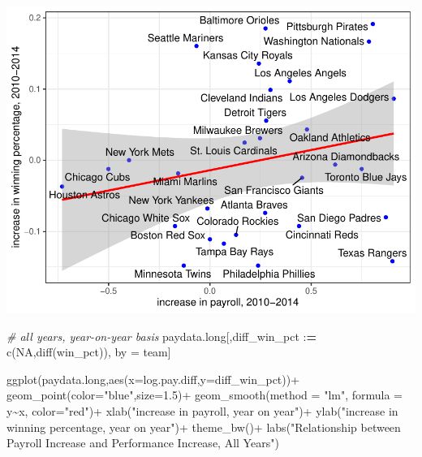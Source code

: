 \documentclass[
  12pt,
]{article}
\newenvironment{Shaded}{\begin{snugshade}}{\end{snugshade}}
\newcommand{\AttributeTok}[1]{\textcolor[rgb]{0.77,0.63,0.00}{#1}}
\newcommand{\CommentTok}[1]{\textcolor[rgb]{0.56,0.35,0.01}{\textit{#1}}}
\newcommand{\ConstantTok}[1]{\textcolor[rgb]{0.00,0.00,0.00}{#1}}
\newcommand{\ErrorTok}[1]{\textcolor[rgb]{0.64,0.00,0.00}{\textbf{#1}}}
\newcommand{\FloatTok}[1]{\textcolor[rgb]{0.00,0.00,0.81}{#1}}
\newcommand{\FunctionTok}[1]{\textcolor[rgb]{0.00,0.00,0.00}{#1}}
\newcommand{\NormalTok}[1]{#1}
\newcommand{\OtherTok}[1]{\textcolor[rgb]{0.56,0.35,0.01}{#1}}
\newcommand{\SpecialCharTok}[1]{\textcolor[rgb]{0.00,0.00,0.00}{#1}}
\newcommand{\StringTok}[1]{\textcolor[rgb]{0.31,0.60,0.02}{#1}}
\begin{document}
\includegraphics{hw1_sol_files/figure-latex/unnamed-chunk-16-1.pdf}

\begin{Shaded}
\begin{Highlighting}[]
\CommentTok{\# all years, year{-}on{-}year basis}
\NormalTok{paydata.long[,diff\_win\_pct }\SpecialCharTok{:}\ErrorTok{=} \FunctionTok{c}\NormalTok{(}\ConstantTok{NA}\NormalTok{,}\FunctionTok{diff}\NormalTok{(win\_pct)), by }\OtherTok{=}\NormalTok{ team]}

\FunctionTok{ggplot}\NormalTok{(paydata.long,}\FunctionTok{aes}\NormalTok{(}\AttributeTok{x=}\NormalTok{log.pay.diff,}\AttributeTok{y=}\NormalTok{diff\_win\_pct))}\SpecialCharTok{+}
  \FunctionTok{geom\_point}\NormalTok{(}\AttributeTok{color=}\StringTok{"blue"}\NormalTok{,}\AttributeTok{size=}\FloatTok{1.5}\NormalTok{)}\SpecialCharTok{+}
  \FunctionTok{geom\_smooth}\NormalTok{(}\AttributeTok{method =} \StringTok{"lm"}\NormalTok{, }\AttributeTok{formula =}\NormalTok{ y}\SpecialCharTok{\textasciitilde{}}\NormalTok{x, }\AttributeTok{color=}\StringTok{"red"}\NormalTok{)}\SpecialCharTok{+}
  \FunctionTok{xlab}\NormalTok{(}\StringTok{"increase in payroll, year on year"}\NormalTok{)}\SpecialCharTok{+}
  \FunctionTok{ylab}\NormalTok{(}\StringTok{"increase in winning percentage, year on year"}\NormalTok{)}\SpecialCharTok{+}
  \FunctionTok{theme\_bw}\NormalTok{()}\SpecialCharTok{+}
  \FunctionTok{labs}\NormalTok{(}\StringTok{"Relationship between Payroll Increase and Performance Increase, All Years"}\NormalTok{)}
\end{Highlighting}
\end{Shaded}
\end{document}
